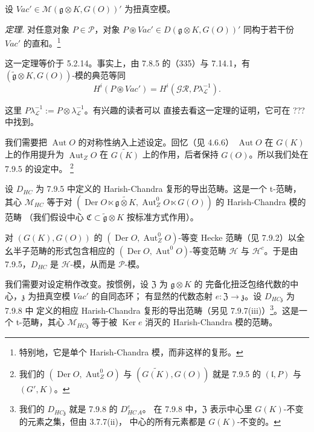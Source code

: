 

设 $\mathit{Vac}'\in\mathcal{M}(\mathfrak{g}\otimes K,G(O))'$ 为扭真空模。

 \emph{定理.} 对任意对象 $P\in\mathcal{P}$，对象
$P\circledast\mathit{Vac}'\in D(\mathfrak{g}\otimes K,G(O))'$ 同构于若干份
$\mathit{Vac}'$ 的直和。\footnote{特别地，它是单个 Harish-Chandra 模，而非这样的复形。}

这一定理等价于 5.2.14。事实上，由 7.8.5 的（335）与 7.14.1，有
$(\tilde{\mathfrak{g}}\otimes K,G(O))$-模的典范等同
\begin{equation}\tag{282}
H^{i}(P\circledast\mathit{Vac}')=H^{i}(\mathcal{GR},P\lambda_{\mathcal{L}}^{-1}).
\end{equation}

这里 $P\lambda_{\mathcal{L}}^{-1}:=P\otimes\lambda_{\mathcal{L}}^{-1}$。有兴趣的读者可以
直接去看这一定理的证明，它可在 ??? 中找到。

 我们需要把 $\operatorname{Aut}O$ 的对称性纳入上述设定。回忆（见 4.6.6）
$\operatorname{Aut}O$ 在 $G(K)$ 上的作用提升为 $\operatorname{Aut}_ZO$ 在
$\widetilde{G(K)}$ 上的作用，后者保持 $G(O)$。所以我们处在 7.9.5 的设定中。
\footnote{我们的 $(\operatorname{Der}O,\operatorname{Aut}^{0}_{Z}O)$ 与
$(\widetilde{G(K)},G(O))$ 就是 7.9.5 的 $(\mathfrak{l},P)$ 与 $(G',K)$。}

设 $D_{HC}$ 为 7.9.5 中定义的 Harish-Chandra 复形的导出范畴。这是一个
t-范畴，其心 $\mathcal{M}_{HC}$ 等于对
$(\operatorname{Der}O\ltimes\widetilde{\mathfrak{g}\otimes K},
\operatorname{Aut}^{0}_{Z}O\ltimes G(O))$ 的 Harish-Chandra 模的范畴
（我们假设中心 $\mathfrak{C}\subset\tilde{\mathfrak{g}}\otimes K$ 按标准方式作用）。

对 $(G(K),G(O))$ 的 $(\operatorname{Der}O,\operatorname{Aut}^{0}_{Z}O)$-等变
Hecke 范畴（见 7.9.2）以全幺半子范畴的形式包含相应的
$(\operatorname{Der}O,\operatorname{Aut}^{0}O)$-等变范畴 $\mathcal{H}$ 与
$\mathcal{H}^{c}$。于是由 7.9.5，$D_{HC}$ 是 $\mathcal{H}$-模，从而是
$\mathcal{P}$-模。

我们需要对设定稍作改变。按惯例，设 $\mathfrak{Z}$ 为 $\mathfrak{g}\otimes K$ 的
完备化扭泛包络代数的中心，$\mathfrak{z}$ 为扭真空模 $\mathit{Vac}'$ 的自同态环；
有显然的代数态射 $e:\mathfrak{Z}\to\mathfrak{z}$。设 $D_{HC\mathfrak{z}}$ 为 7.9.8 中
定义的相应 Harish-Chandra 复形的导出范畴（另见
7.9.7(iii)）\footnote{我们的 $D_{HC\mathfrak{z}}$ 就是 7.9.8 的 $D^{e}_{HC\,A}$。
在 7.9.8 中，$\mathfrak{Z}$ 表示中心里 $G(K)$-不变的元素之集，但由 3.7.7(ii)，
中心的所有元素都是 $G(K)$-不变的。}。这是一个 t-范畴，其心
$\mathcal{M}_{HC\mathfrak{z}}$ 等于被 $\operatorname{Ker}e$ 消灭的
Harish-Chandra 模的范畴。


